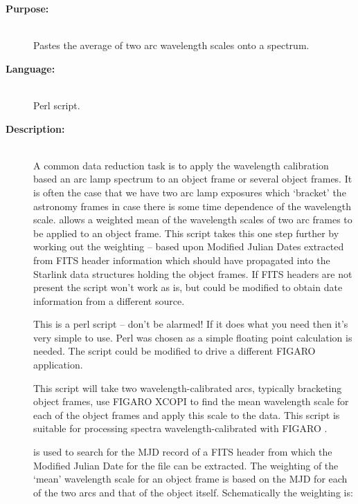 \documentclass[twoside,11pt]{starlink}
\providecommand{\scspec}[2]{#1}
\begin{document}
\begin{description}

\item [\textbf{Purpose:}] \mbox{} \\
     Pastes the average of two arc wavelength scales onto a spectrum.

\item [\textbf{Language:}] \mbox{} \\
     Perl script.

\item [\textbf{Description:}] \mbox{} \\
     A common data reduction task is to apply the wavelength calibration
     based an arc lamp spectrum to an object frame or several object
     frames.  It is often the case that we have two arc lamp exposures which
     `bracket' the astronomy frames in case there is some time dependence
     of the wavelength scale.  
      allows a weighted mean of the
     wavelength scales of two arc frames to be applied to an object frame.
     This script takes this one step further by working out the weighting
     \scspec{--}{-}
     based upon Modified Julian Dates extracted from FITS header
     information which should have propagated into the Starlink data
     structures holding the object frames.  If FITS headers are not present
     the script won't work as is, but could be modified to obtain date
     information from a different source.

     This is a perl script \scspec{--}{-} don't be alarmed!
     If it does what you need then it's very simple to use.
     Perl was chosen as a simple floating point calculation is needed.
     The script could be modified to drive a different FIGARO application.

     This script will take two wavelength-calibrated arcs, typically
     bracketing object frames, use FIGARO XCOPI to find the mean
     wavelength scale for each of the object frames and apply this
     scale to the data.  This script is suitable for processing spectra
     wavelength-calibrated with FIGARO .

      is used to search for the MJD record of a
     FITS header from which the Modified Julian Date for the file can be
     extracted.  The weighting of the `mean' wavelength scale for an
     object frame is based on the MJD for each of the two arcs and that
     of the object itself.  Schematically the weighting is:


\end{description}
\end{document}
